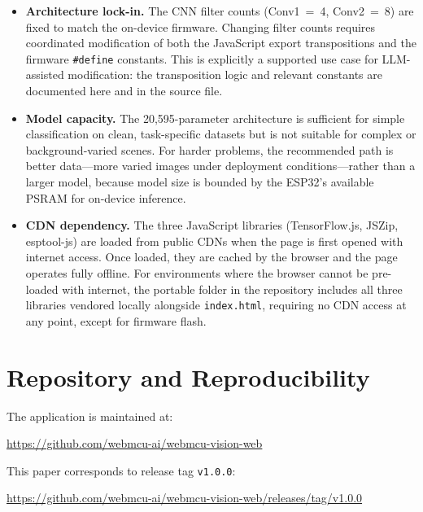 \documentclass[11pt]{article}
\begin{document}
\begin{itemize}
  \item \textbf{Architecture lock-in.} The CNN filter counts (Conv1~=~4, Conv2~=~8)
        are fixed to match the on-device firmware. Changing filter counts requires
        coordinated modification of both the JavaScript export transpositions and the
        firmware \texttt{\#define} constants. This is explicitly a supported use case
        for LLM-assisted modification: the transposition logic and relevant constants
        are documented here and in the source file.

  \item \textbf{Model capacity.} The 20,595-parameter architecture is sufficient for
        simple classification on clean, task-specific datasets but is not suitable for
        complex or background-varied scenes. For harder problems, the recommended path
        is better data---more varied images under deployment conditions---rather than a
        larger model, because model size is bounded by the ESP32's available PSRAM for
        on-device inference.

  \item \textbf{CDN dependency.} The three JavaScript libraries (TensorFlow.js, JSZip,
        esptool-js) are loaded from public CDNs when the page is first opened with
        internet access. Once loaded, they are cached by the browser and the page
        operates fully offline. For environments where the browser cannot be pre-loaded
        with internet, the portable folder in the repository includes all three
        libraries vendored locally alongside \texttt{index.html}, requiring no CDN
        access at any point, except for firmware flash.
\end{itemize}

\section{Repository and Reproducibility}

The application is maintained at:
\begin{center}
\url{https://github.com/webmcu-ai/webmcu-vision-web}
\end{center}

This paper corresponds to release tag \texttt{v1.0.0}:
\begin{center}
\url{https://github.com/webmcu-ai/webmcu-vision-web/releases/tag/v1.0.0}
\end{center}
\end{document}
